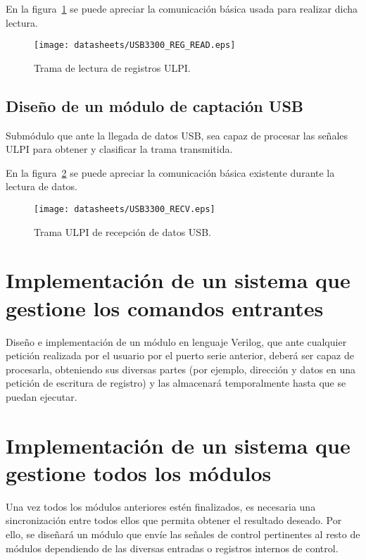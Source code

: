 En la figura~\ref{fig:ULPI_REG_READ} se puede apreciar la comunicación básica usada para realizar dicha lectura.
\begin{figure}[hbt]
    \centering
    \texttt{[image: datasheets/USB3300\_REG\_READ.eps]}
    \caption{Trama de lectura de registros ULPI.}
    \label{fig:ULPI_REG_READ}
\end{figure}

\subsection{Diseño de un módulo de captación USB}
Submódulo que ante la llegada de datos USB, sea capaz de procesar las señales ULPI para obtener y clasificar la trama transmitida.

En la figura~\ref{fig:ULPI_RECV} se puede apreciar la comunicación básica existente durante la lectura de datos.
\begin{figure}[hbt]
    \centering
    \texttt{[image: datasheets/USB3300\_RECV.eps]}
    \caption{Trama ULPI de recepción de datos USB.}
    \label{fig:ULPI_RECV}
\end{figure}



\section{Implementación de un sistema que gestione los comandos entrantes}
Diseño e implementación de un módulo en lenguaje Verilog, que ante cualquier petición realizada por el usuario por el puerto serie anterior, deberá ser capaz de procesarla, obteniendo sus diversas partes (por ejemplo, dirección y datos en una petición de escritura de registro) y las almacenará temporalmente hasta que se puedan ejecutar.



\section{Implementación de un sistema que gestione todos los módulos}
Una vez todos los módulos anteriores estén finalizados, es necesaria una sincronización entre todos ellos que permita obtener el resultado deseado. Por ello, se diseñará un módulo que envíe las señales de control pertinentes al resto de módulos dependiendo de las diversas entradas o registros internos de control.



